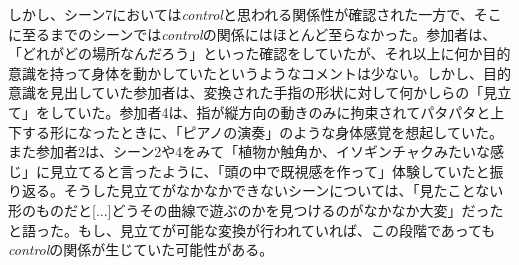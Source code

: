 しかし、シーン7においては\textit{control}と思われる関係性が確認された一方で、そこに至るまでのシーンでは\textit{control}の関係にはほとんど至らなかった。参加者は、「どれがどの場所なんだろう」といった確認をしていたが、それ以上に何か目的意識を持って身体を動かしていたというようなコメントは少ない。しかし、目的意識を見出していた参加者は、変換された手指の形状に対して何かしらの「見立て」をしていた。参加者4は、指が縦方向の動きのみに拘束されてパタパタと上下する形になったときに、「ピアノの演奏」のような身体感覚を想起していた。また参加者2は、シーン2や4をみて「植物か触角か、イソギンチャクみたいな感じ」に見立てると言ったように、「頭の中で既視感を作って」体験していたと振り返る。そうした見立てがなかなかできないシーンについては、「見たことない形のものだと[...]どうその曲線で遊ぶのかを見つけるのがなかなか大変」だったと語った。もし、見立てが可能な変換が行われていれば、この段階であっても\textit{control}の関係が生じていた可能性がある。



